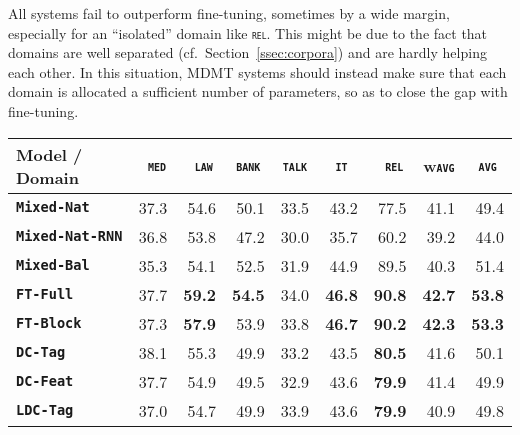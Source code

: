 \documentclass[11pt,a4paper]{article}
\newcommand{\fyDone}[1]{\done[FY]\Todo[FY:]{\textcolor{orange}{#1}}}
\newcommand{\domain}[1]{\texttt{\textsc{#1}}}
\newcommand{\system}[1]{\texttt{\textbf{#1}}}
\newcommand{\SB}[1]{\textbf{#1}}
\newcommand{\SW}[1]{\underline{#1}}
\begin{document}
All systems fail to outperform fine-tuning, sometimes by a wide margin, especially for an ``isolated'' domain like \domain{rel}. This might be due to the fact that domains are well separated (cf.\ Section~\ref{ssec:corpora}) and are hardly helping each other. In this situation, MDMT systems should instead make sure that each domain is allocated a sufficient number of parameters, so as to close the gap with fine-tuning.
\fyDone{More comments when we have all the results}\fyDone{Importance of sharing and unsharing}

\begin{table*}
  \centering
  \fyDone{Fix column size}
  \begin{tabular}{|p{3cm}|*{8}{r|}} \hline
    Model / Domain & \multicolumn{1}{c|}{\domain{ med}} & \multicolumn{1}{c|}{\domain{ law}} & \multicolumn{1}{c|}{\domain{bank}} & \multicolumn{1}{c|}{\domain{talk}} & \multicolumn{1}{c|}{\domain{ it }} & \multicolumn{1}{c|}{\domain{ rel}} & \multicolumn{1}{c|}{w\domain{avg}} & \multicolumn{1}{c|}{\domain{avg}} \\ \hline %
    \system{Mixed-Nat}  & 37.3 & 54.6 & 50.1 & 33.5 & 43.2 & 77.5  & 41.1  & 49.4 \\%
    \system{Mixed-Nat-RNN}  & 36.8 & 53.8 & 47.2 & 30.0 & 35.7 & 60.2  & 39.2  & 44.0 \\
    \system{Mixed-Bal}   &  35.3 & 54.1 & 52.5 & 31.9 & 44.9 & 89.5 & 40.3  & 51.4 \\ %
    \system{FT-Full}       & 37.7 & \SB{59.2} & \SB{54.5} & 34.0 & \SB{46.8} & \SB{90.8}   & \SB{42.7} & \SB{53.8} \\
   \system{FT-Block}     & 37.3 & \SB{57.9} & 53.9 & 33.8 & \SB{46.7} & \SB{90.2}  & \SB{42.3} & \SB{53.3} \\ \hline %
    \system{DC-Tag}       & 38.1 & 55.3 & 49.9   & 33.2 & 43.5 & \SB{80.5} &41.6 & 50.1    \\%
    \system{DC-Feat}      & 37.7  & 54.9 & 49.5   & 32.9 & 43.6 & \SB{79.9} &41.4 & 49.9   \\%
    \system{LDC-Tag}     & 37.0   & 54.7 & 49.9 & 33.9 & 43.6 & \SB{79.9} &40.9 & 49.8          \\%

\end{tabular}
\end{table*}
\end{document}
